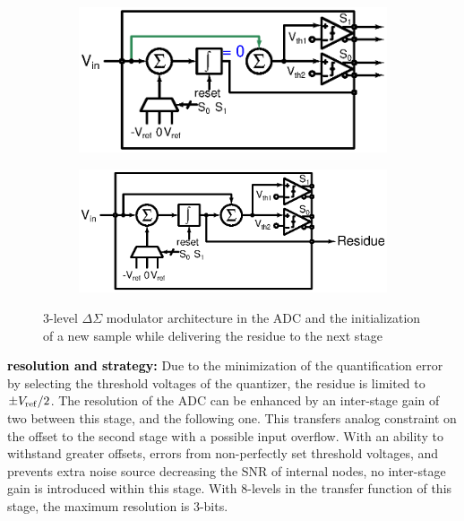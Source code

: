 \begin{figure}[htp]
	\centering
	\begin{subfigure}[b]{0.48\textwidth}
		\centering
		\includegraphics[width=\textwidth]{Chapter4/Figs/isd-principle-reset.ps}
		\label{fig:isd-alone-reset-clk-cycle}
	\end{subfigure}
	\begin{subfigure}[b]{0.48\textwidth}
		\centering
		\includegraphics[width=\textwidth]{Chapter4/Figs/isd-principle.ps}
		\label{fig:isd-alone-std-clk-cycle}
	\end{subfigure}
	\caption{3-level \(\Delta\Sigma \) modulator architecture in the ADC and the initialization of a new sample while delivering the
	residue to the next stage}
	\label{fig:isd-alone-clk-cycle}
\end{figure}

\textbf{\textcolor{black}{resolution and strategy:}}
Due to the minimization of the quantification error by selecting the threshold voltages of the quantizer, the residue is limited to $\pm V_{\rm ref}/2$. The resolution of the ADC can be enhanced by an inter-stage gain of two between this stage, and the following one. This transfers analog constraint on the offset to the second stage with a possible input overflow. With an ability to withstand greater offsets, errors from non-perfectly set threshold voltages, and prevents extra noise source decreasing the SNR of internal nodes, no inter-stage gain is introduced within this stage. With 8-levels in the transfer function of this stage, the maximum resolution is 3-bits.

